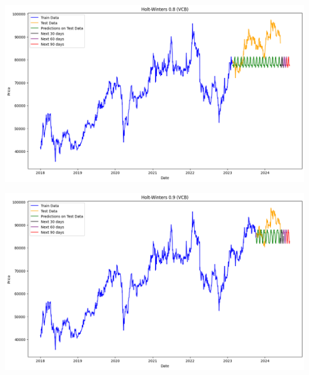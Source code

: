 \documentclass[conference]{IEEEtran}
\begin{document}
\begin{minipage}{0.23\textwidth}
    \centering
    \includegraphics[width=\linewidth]{images/Holt Winter/HW_VCB_82.png}
    \label{fig:image1}
\end{minipage}
\hfill
\begin{minipage}{0.23\textwidth}
    \centering
    \includegraphics[width=\linewidth]{images/Holt Winter/HW_VCB_91.png}
    \label{fig:image2}
\end{minipage}
\end{document}
